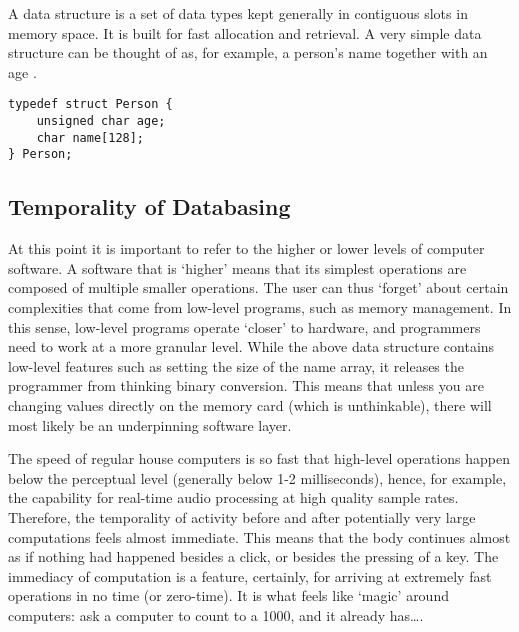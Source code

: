 A data structure is a set of data types kept generally in contiguous slots in memory space. It is built for fast allocation and retrieval. A very simple data structure can be thought of as, for example, a person's name together with an age .

\begin{flushleft}
\small
\begin{lstlisting}[caption={An example of a data structure in the programming language C. It is named \texttt{Person}, and it holds two variables: \texttt{age} and \texttt{name}, respectively a positive integer and a string of up to 128 characters.},captionpos=b,label={lst:person}]
typedef struct Person {
	unsigned char age;
	char name[128];
} Person;
\end{lstlisting}
\end{flushleft}

\subsection{Temporality of Databasing}

At this point it is important to refer to the higher or lower levels of computer software. A software that is `higher' means that its simplest operations are composed of multiple smaller operations. The user can thus `forget' about certain complexities that come from low-level programs, such as memory management. In this sense, low-level programs operate `closer' to hardware, and programmers need to work at a more granular level. While the above data structure contains low-level features such as setting the size of the name array, it releases the programmer from thinking binary conversion. This means that unless you are changing values directly on the memory card (which is unthinkable), there will most likely be an underpinning software layer. 

The speed of regular house computers is so fast that high-level operations happen below the perceptual level (generally below 1-2 milliseconds), hence, for example, the capability for real-time audio processing at high quality sample rates. Therefore, the temporality of activity before and after potentially very large computations feels almost immediate. This means that the body continues almost as if nothing had happened besides a click, or besides the pressing of a key. The immediacy of computation is a feature, certainly, for arriving at extremely fast operations in no time (or zero-time). It is what feels like `magic' around computers: ask a computer to count to a 1000, and it already has\dots. 

